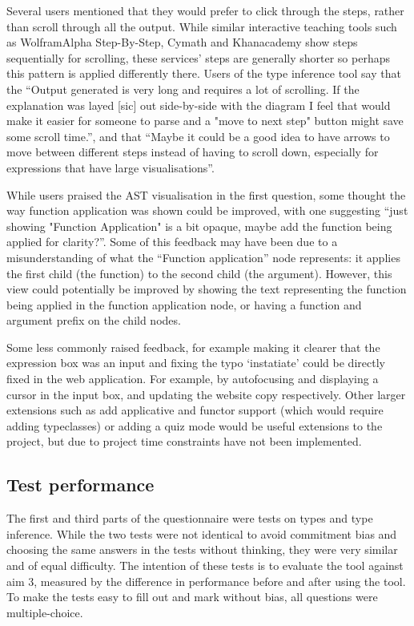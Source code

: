 \documentclass[a4paper,fleqn,oneside,12pt]{report}
\begin{document}
Several users mentioned that they would prefer to click through the steps, rather than scroll through all the output. While similar interactive teaching tools such as WolframAlpha Step-By-Step, Cymath and Khanacademy show steps sequentially for scrolling, these services’ steps are generally shorter so perhaps this pattern is applied differently there. Users of the type inference tool say that the “Output generated is very long and requires a lot of scrolling. If the explanation was layed [sic] out side-by-side with the diagram I feel that would make it easier for someone to parse and a "move to next step" button might save some scroll time.”, and that “Maybe it could be a good idea to have arrows to move between different steps instead of having to scroll down, especially for expressions that have large visualisations”.

While users praised the AST visualisation in the first question, some thought the way function application was shown could be improved, with one suggesting “just showing "Function Application" is a bit opaque, maybe add the function being applied for clarity?”. Some of this feedback may have been due to a misunderstanding of what the “Function application” node represents: it applies the first child (the function) to the second child (the argument). However, this view could potentially be improved by showing the text representing the function being applied in the function application node, or having a function and argument prefix on the child nodes.

Some less commonly raised feedback, for example making it clearer that the expression box was an input and fixing the typo ‘instatiate’ could be directly fixed in the web application. For example, by autofocusing and displaying a cursor in the input box, and updating the website copy respectively. Other larger extensions such as add applicative and functor support (which would require adding typeclasses) or adding a quiz mode would be useful extensions to the project, but due to project time constraints have not been implemented.
\subsection{Test performance}\label{id:h.cn0p90nrqrmi}
The first and third parts of the questionnaire were tests on types and type inference. While the two tests were not identical to avoid commitment bias and choosing the same answers in the tests without thinking, they were very similar and of equal difficulty. The intention of these tests is to evaluate the tool against aim 3, measured by the difference in performance before and after using the tool. To make the tests easy to fill out and mark without bias, all questions were multiple-choice.
\end{document}
